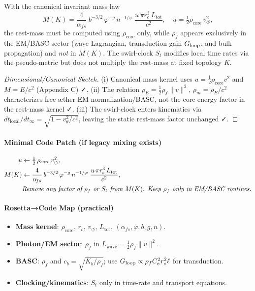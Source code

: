 \documentclass[10pt,reprint,aps,onecolumn,nofootinbib]{revtex4-2}
\begin{document}
    \begin{proposition}
        With the canonical invariant mass law
        \[
            M(K)=\frac{4}{\alpha_{\!fs}}\; b^{-3/2}\,\varphi^{-g}\,n^{-1/\varphi}\;
            \frac{u\,\pi r_c^{3}\,L_{\text{tot}}}{c^2},
            \quad u=\tfrac{1}{2}\rho_{\text{core}}\,v_{\circlearrowleft}^{2},
        \]
        the rest-mass must be computed using $\rho_{\text{core}}$ only, while $\rho_f$ appears exclusively in the EM/BASC sector (wave Lagrangian, transduction gain $G_{\rm loop}$, and bulk propagation) and \emph{not} in $M(K)$. The swirl-clock $S_t$ modifies local time rates via the pseudo-metric but does not multiply the rest-mass at fixed topology $K$.
    \end{proposition}

    \begin{proof}[Dimensional/Canonical Sketch]
    (i) Canonical mass kernel uses $u=\tfrac12\rho_{\text{core}}v^2$ and $M=E/c^2$ (Appendix C) ✓.
    (ii) The relation $\rho_E=\tfrac12\rho_f\|v\|^2$, $\rho_m=\rho_E/c^2$ characterizes free-æther EM normalization/BASC, not the core-energy factor in the rest-mass kernel ✓.
    (iii) The swirl-clock enters kinematics via $dt_{\text{local}}/dt_\infty=\sqrt{1-v_\theta^2/c^2}$, leaving the static rest-mass factor unchanged ✓.
    \end{proof}

    \paragraph{Minimal Code Patch (if legacy mixing exists)}
        \begin{align*}
            u &\leftarrow \tfrac12\,\rho_{\text{core}}\,v_{\circlearrowleft}^{2}, \\
            M(K) &\leftarrow \frac{4}{\alpha_{\!fs}}\,b^{-3/2}\,\varphi^{-g}\,n^{-1/\varphi}\;
            \frac{u\,\pi r_c^3\,L_{\text{tot}}}{c^2}, \\
            &\text{\emph{Remove any factor of $\rho_f$ or $S_t$ from $M(K)$. Keep $\rho_f$ only in EM/BASC routines.}}
        \end{align*}

    \paragraph{Rosetta→Code Map (practical)}
        \begin{itemize}
            \item \textbf{Mass kernel}: $\rho_{\text{core}},\,r_c,\,v_{\circlearrowleft},\,L_{\text{tot}},\,(\alpha_{\!fs},\varphi,b,g,n)$.
            \item \textbf{Photon/EM sector}: $\rho_f$ in $L_{\text{wave}}=\tfrac12\rho_f\|v\|^2$.
            \item \textbf{BASC}: $\rho_f$ and $c_b=\sqrt{K_b/\rho_f}$; use $G_{\rm loop}\propto \rho_f C_e^2 r_c^2 \ell$ for transduction.
            \item \textbf{Clocking/kinematics}: $S_t$ only in time-rate and transport equations.
        \end{itemize}
\end{document}
